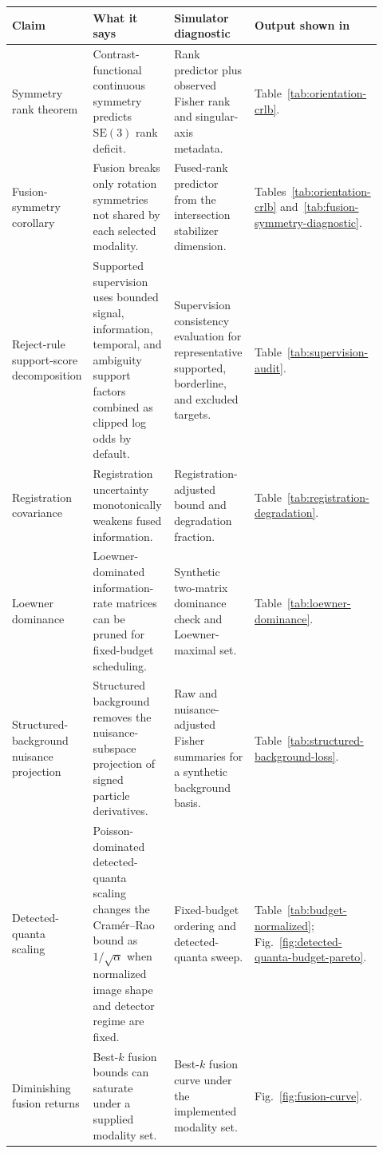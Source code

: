 \begin{tabular}{@{}>{\raggedright\arraybackslash}p{0.18\linewidth}>{\raggedright\arraybackslash}p{0.28\linewidth}>{\raggedright\arraybackslash}p{0.28\linewidth}>{\raggedright\arraybackslash}p{0.18\linewidth}@{}}
\toprule
Claim & What it says & Simulator diagnostic & Output shown in \\
\midrule
Symmetry rank theorem & Contrast-functional continuous symmetry predicts $\mathrm{SE}(3)$ rank deficit. & Rank predictor plus observed Fisher rank and singular-axis metadata. & Table~\ref{tab:orientation-crlb}. \\
Fusion-symmetry corollary & Fusion breaks only rotation symmetries not shared by each selected modality. & Fused-rank predictor from the intersection stabilizer dimension. & Tables~\ref{tab:orientation-crlb} and~\ref{tab:fusion-symmetry-diagnostic}. \\
Reject-rule support-score decomposition & Supported supervision uses bounded signal, information, temporal, and ambiguity support factors combined as clipped log odds by default. & Supervision consistency evaluation for representative supported, borderline, and excluded targets. & Table~\ref{tab:supervision-audit}. \\
Registration covariance & Registration uncertainty monotonically weakens fused information. & Registration-adjusted bound and degradation fraction. & Table~\ref{tab:registration-degradation}. \\
Loewner dominance & Loewner-dominated information-rate matrices can be pruned for fixed-budget scheduling. & Synthetic two-matrix dominance check and Loewner-maximal set. & Table~\ref{tab:loewner-dominance}. \\
Structured-background nuisance projection & Structured background removes the nuisance-subspace projection of signed particle derivatives. & Raw and nuisance-adjusted Fisher summaries for a synthetic background basis. & Table~\ref{tab:structured-background-loss}. \\
Detected-quanta scaling & Poisson-dominated detected-quanta scaling changes the Cram\'{e}r--Rao bound as $1/\sqrt{\alpha}$ when normalized image shape and detector regime are fixed. & Fixed-budget ordering and detected-quanta sweep. & Table~\ref{tab:budget-normalized}; Fig.~\ref{fig:detected-quanta-budget-pareto}. \\
Diminishing fusion returns & Best-$k$ fusion bounds can saturate under a supplied modality set. & Best-$k$ fusion curve under the implemented modality set. & Fig.~\ref{fig:fusion-curve}. \\
\bottomrule
\end{tabular}
